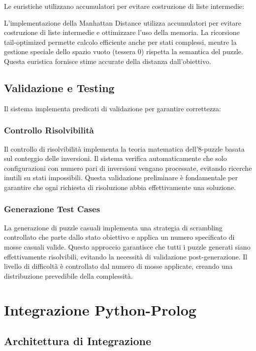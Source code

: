 \documentclass[12pt,a4paper]{report}
\theoremstyle{definition}
\begin{document}
Le euristiche utilizzano accumulatori per evitare costruzione di liste intermedie:

L'implementazione della Manhattan Distance utilizza accumulatori per evitare costruzione di liste intermedie e ottimizzare l'uso della memoria. La ricorsione tail-optimized permette calcolo efficiente anche per stati complessi, mentre la gestione speciale dello spazio vuoto (tessera 0) rispetta la semantica del puzzle. Questa euristica fornisce stime accurate della distanza dall'obiettivo.

\section{Validazione e Testing}

Il sistema implementa predicati di validazione per garantire correttezza:

\subsection{Controllo Risolvibilità}

Il controllo di risolvibilità implementa la teoria matematica dell'8-puzzle basata sul conteggio delle inversioni. Il sistema verifica automaticamente che solo configurazioni con numero pari di inversioni vengano processate, evitando ricerche inutili su stati impossibili. Questa validazione preliminare è fondamentale per garantire che ogni richiesta di risoluzione abbia effettivamente una soluzione.

\subsection{Generazione Test Cases}

La generazione di puzzle casuali implementa una strategia di scrambling controllato che parte dallo stato obiettivo e applica un numero specificato di mosse casuali valide. Questo approccio garantisce che tutti i puzzle generati siano effettivamente risolvibili, evitando la necessità di validazione post-generazione. Il livello di difficoltà è controllato dal numero di mosse applicate, creando una distribuzione prevedibile della complessità.


\chapter{Integrazione Python-Prolog}

\section{Architettura di Integrazione}
\end{document}
